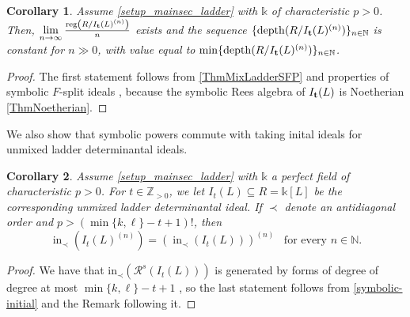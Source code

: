 \documentclass[12pt]{amsart}
\newtheorem{corollary}[corollary]{Corollary}
\newtheorem{proposition}[proposition]{Proposition}
\theoremstyle{definition}
\renewcommand{\(}{\left(}
\renewcommand{\)}{\right)}
\newcommand{\NN}{\mathbb{N} }
\newcommand{\ZZ}{\mathbb{Z}}
\newcommand{\IN}{\operatorname{in}}
\newcommand{\cR}{\mathcal{R}}
\newcommand{\reg}{\operatorname{reg}}
\newcommand{\Depth}{\operatorname{depth}}
\newcommand{\depth}{\operatorname{depth}}
\renewcommand{\!}[1]{{\color{red}\text{\Huge$\star$ }#1}}
\DeclareMathOperator{\lcm}{{lcm}}
\newcommand{\init}{\mathrm{in}}
\newcommand{\ttt}{{\bf t}}
\begin{document}
\begin{corollary}\label{cor_RegDEpth}
Assume \autoref{setup_mainsec_ladder} with   $\mathbb{k}$ of  characteristic $p>0$.  Then,
$\lim\limits_{n\to\infty}\frac{\reg\left(R/I_\ttt(L)^{(n)}\right)}{n}$ exists and the sequence
$\{\Depth(R/I_\ttt(L)^{(n)})\}_{n \in \NN}$ is constant for $n\gg0$, with value equal to $\min\{\depth(R/I_\ttt(L)^{(n)})\}_{n \in \NN}$.
\end{corollary}
\begin{proof}
The first  statement follows from  \autoref{ThmMixLadderSFP} and properties of symbolic $F$-split ideals \cite[Theorem 4.10]{DSMNB}, because the symbolic Rees algebra of $I_\ttt(L)$ is Noetherian \autoref{ThmNoetherian}. 
\end{proof}

%

We also show that symbolic powers commute with taking inital ideals for unmixed ladder determinantal ideals.
\begin{corollary}\label{cor_SAGBI}
Assume \autoref{setup_mainsec_ladder} with   $\mathbb{k}$ a perfect field of  characteristic $p>0$. For $t \in \ZZ_{>0}$, we let $I_t(L) \subseteq R=\mathbb{k}[L]$ be the corresponding unmixed ladder determinantal ideal.  If $\prec$ denote an antidiagonal order and $p>(\min\{k,\ell\}-t+1)!$, then
$$
\IN_\prec\left(I_t(L)^{(n)}\right)=\left(\IN_\prec \left(I_t(L)\right)\right)^{(n)} \,\,\, \text{ for every }n\in\NN.
$$
\end{corollary}
\begin{proof}
We have that
$\init_\prec\left(\cR^s\left(I_t(L)\right)\right)$  is generated by forms of degree of degree at most $\min\{k,\ell\}-t+1$  \cite[Theorem 4.1]{brunsconca98}, so the last statement follows from  \autoref{symbolic-initial} and the Remark following it.
\end{proof}
\end{document}
